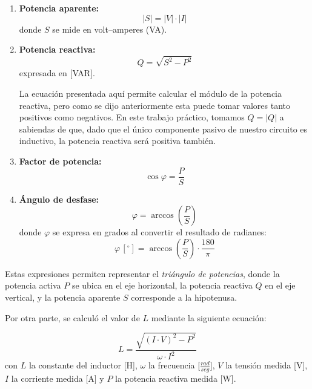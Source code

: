 \documentclass{article}
\begin{document}
            \begin{enumerate}
                \item \textbf{Potencia aparente:}
                \[
                    |S| = |V| \cdot |I|
                \]
                donde $S$ se mide en volt–amperes (VA).

                \item \textbf{Potencia reactiva:}
                \[
                    Q = \sqrt{S^{2} - P^{2}}
                \]
                expresada en [VAR]. \par
                
                La ecuación presentada aquí permite calcular el módulo de la potencia reactiva, pero como se dijo
                anteriormente esta puede tomar valores tanto positivos como negativos. En este trabajo práctico, 
                tomamos $Q=|Q|$ a sabiendas de que, dado que el único componente pasivo de nuestro circuito es inductivo, 
                la potencia reactiva será positiva también.

                \item \textbf{Factor de potencia:}
                \[
                    \cos \varphi = \frac{P}{S}
                \]

                \item \textbf{Ángulo de desfase:}
                \[
                    \varphi = \arccos\left( \frac{P}{S} \right)
                \]
                donde $\varphi$ se expresa en grados al convertir el resultado de 
                radianes:
                \[
                    \varphi \,[^\circ] = \arccos\left( \frac{P}{S} \right) \cdot 
                    \frac{180}{\pi}
                \]
            \end{enumerate}

                    Estas expresiones permiten representar el \textit{triángulo de potencias}, 
                    donde la potencia activa $P$ se ubica en el eje horizontal, la potencia 
                    reactiva $Q$ en el eje vertical, y la potencia aparente $S$ corresponde a 
                    la hipotenusa.\par

                Por otra parte, se calculó el valor de $L$ mediante la siguiente ecuación:

                \begin{equation*}
                    L = \frac{\sqrt{(I \cdot V)^2- P^2}}{\omega \cdot I^2} 
                \end{equation*}
                con $L$ la constante del inductor [H], $\omega$ la frecuencia [$\frac{rad}{seg}$], $V$ la tensión medida [V], $I$ la corriente medida [A] y $P$ la potencia reactiva medida [W]. \par
                
\end{document}
